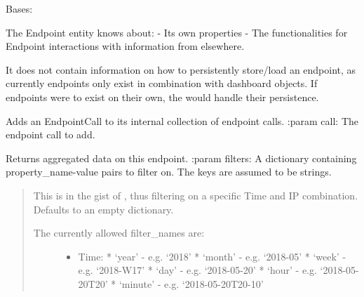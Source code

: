 \documentclass[letterpaper,10pt,english]{sphinxmanual}
\begin{document}
\begin{fulllineitems}
\label{\detokenize{pydash_app.dashboard.endpoint:pydash_app.dashboard.endpoint.Endpoint}}
Bases: 

The Endpoint entity knows about:
- Its own properties
- The functionalities for Endpoint interactions with information from elsewhere.

It does not contain information on how to persistently store/load an endpoint,
as currently endpoints only exist in combination with dashboard objects.
If endpoints were to exist on their own, the  would handle their persistence.

\begin{fulllineitems}
\label{\detokenize{pydash_app.dashboard.endpoint:pydash_app.dashboard.endpoint.Endpoint.add_endpoint_call}}
Adds an EndpointCall to its internal collection of endpoint calls.
:param call: The endpoint call to add.

\end{fulllineitems}


\begin{fulllineitems}
\label{\detokenize{pydash_app.dashboard.endpoint:pydash_app.dashboard.endpoint.Endpoint.aggregated_data}}
Returns aggregated data on this endpoint.
:param filters: A dictionary containing property\_name-value pairs to filter on. The keys are assumed to be strings.
\begin{quote}

This is in the gist of , thus filtering on a specific Time and IP combination.
Defaults to an empty dictionary.
\begin{description}
\item[{The currently allowed filter\_names are:}] \leavevmode\begin{itemize}
\item {} 
Time:
* ‘year’   - e.g. ‘2018’
* ‘month’  - e.g. ‘2018-05’
* ‘week’   - e.g. ‘2018-W17’
* ‘day’    - e.g. ‘2018-05-20’
* ‘hour’   - e.g. ‘2018-05-20T20’
* ‘minute’ - e.g. ‘2018-05-20T20-10’


\end{itemize}
\end{description}
\end{quote}
\end{fulllineitems}
\end{fulllineitems}
\end{document}
